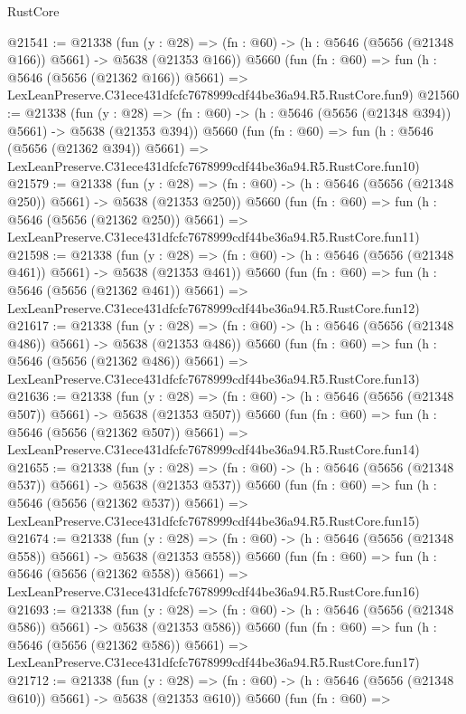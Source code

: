 \begin{lexlean}{RustCore}
\begin{coremodule}
@21541 := @21338
    (fun (y : @28) => (fn : @60) -> (h : @5646 (@5656 (@21348 @166)) @5661) -> @5638 (@21353 @166))
    @5660
    (fun (fn : @60) =>
    fun (h : @5646 (@5656 (@21362 @166)) @5661) =>
    LexLeanPreserve.C31ece431dfcfc7678999cdf44be36a94.R5.RustCore.fun9)
@21560 := @21338
    (fun (y : @28) => (fn : @60) -> (h : @5646 (@5656 (@21348 @394)) @5661) -> @5638 (@21353 @394))
    @5660
    (fun (fn : @60) =>
    fun (h : @5646 (@5656 (@21362 @394)) @5661) =>
    LexLeanPreserve.C31ece431dfcfc7678999cdf44be36a94.R5.RustCore.fun10)
@21579 := @21338
    (fun (y : @28) => (fn : @60) -> (h : @5646 (@5656 (@21348 @250)) @5661) -> @5638 (@21353 @250))
    @5660
    (fun (fn : @60) =>
    fun (h : @5646 (@5656 (@21362 @250)) @5661) =>
    LexLeanPreserve.C31ece431dfcfc7678999cdf44be36a94.R5.RustCore.fun11)
@21598 := @21338
    (fun (y : @28) => (fn : @60) -> (h : @5646 (@5656 (@21348 @461)) @5661) -> @5638 (@21353 @461))
    @5660
    (fun (fn : @60) =>
    fun (h : @5646 (@5656 (@21362 @461)) @5661) =>
    LexLeanPreserve.C31ece431dfcfc7678999cdf44be36a94.R5.RustCore.fun12)
@21617 := @21338
    (fun (y : @28) => (fn : @60) -> (h : @5646 (@5656 (@21348 @486)) @5661) -> @5638 (@21353 @486))
    @5660
    (fun (fn : @60) =>
    fun (h : @5646 (@5656 (@21362 @486)) @5661) =>
    LexLeanPreserve.C31ece431dfcfc7678999cdf44be36a94.R5.RustCore.fun13)
@21636 := @21338
    (fun (y : @28) => (fn : @60) -> (h : @5646 (@5656 (@21348 @507)) @5661) -> @5638 (@21353 @507))
    @5660
    (fun (fn : @60) =>
    fun (h : @5646 (@5656 (@21362 @507)) @5661) =>
    LexLeanPreserve.C31ece431dfcfc7678999cdf44be36a94.R5.RustCore.fun14)
@21655 := @21338
    (fun (y : @28) => (fn : @60) -> (h : @5646 (@5656 (@21348 @537)) @5661) -> @5638 (@21353 @537))
    @5660
    (fun (fn : @60) =>
    fun (h : @5646 (@5656 (@21362 @537)) @5661) =>
    LexLeanPreserve.C31ece431dfcfc7678999cdf44be36a94.R5.RustCore.fun15)
@21674 := @21338
    (fun (y : @28) => (fn : @60) -> (h : @5646 (@5656 (@21348 @558)) @5661) -> @5638 (@21353 @558))
    @5660
    (fun (fn : @60) =>
    fun (h : @5646 (@5656 (@21362 @558)) @5661) =>
    LexLeanPreserve.C31ece431dfcfc7678999cdf44be36a94.R5.RustCore.fun16)
@21693 := @21338
    (fun (y : @28) => (fn : @60) -> (h : @5646 (@5656 (@21348 @586)) @5661) -> @5638 (@21353 @586))
    @5660
    (fun (fn : @60) =>
    fun (h : @5646 (@5656 (@21362 @586)) @5661) =>
    LexLeanPreserve.C31ece431dfcfc7678999cdf44be36a94.R5.RustCore.fun17)
@21712 := @21338
    (fun (y : @28) => (fn : @60) -> (h : @5646 (@5656 (@21348 @610)) @5661) -> @5638 (@21353 @610))
    @5660
    (fun (fn : @60) =>

\end{coremodule}
\end{lexlean}
